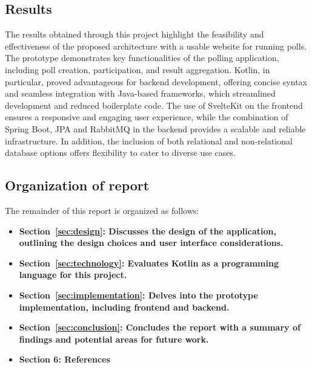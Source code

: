 \subsection{Results}
The results obtained through this project highlight the feasibility and effectiveness of the proposed architecture with a usable website for running polls.
The prototype demonstrates key functionalities of the polling application, including poll creation, participation, and result aggregation.
Kotlin, in particular, proved advantageous for backend development, offering concise syntax and seamless integration with Java-based frameworks, which streamlined development and reduced boilerplate code.
The use of SvelteKit on the frontend ensures a responsive and engaging user experience, while the combination of Spring Boot, JPA and RabbitMQ in the backend provides a scalable and reliable infrastructure.
In addition, the inclusion of both relational and non-relational database options offers flexibility to cater to diverse use cases. \\

\subsection{Organization of report}
The remainder of this report is organized as follows:
\begin{itemize}
    \item \textbf{Section~\ref{sec:design}: Discusses the design of the application, outlining the design choices and user interface considerations.}
    \item \textbf{Section~\ref{sec:technology}: Evaluates Kotlin as a programming language for this project.}
    \item \textbf{Section~\ref{sec:implementation}: Delves into the prototype implementation, including frontend and backend.}
    \item \textbf{Section~\ref{sec:conclusion}: Concludes the report with a summary of findings and potential areas for future work.}
    \item \textbf{Section 6: References}
\end{itemize}
